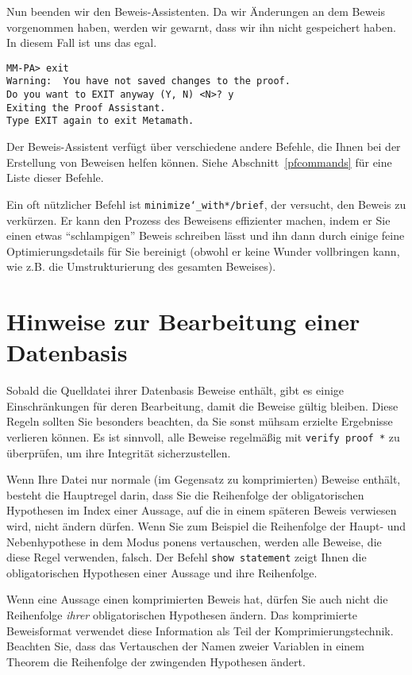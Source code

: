 Nun beenden wir den Beweis-Assistenten.  Da wir Änderungen an dem Beweis vorgenommen haben, werden wir gewarnt, dass wir ihn nicht gespeichert haben.  In diesem Fall ist uns das egal.

\begin{verbatim}
MM-PA> exit
Warning:  You have not saved changes to the proof.
Do you want to EXIT anyway (Y, N) <N>? y
Exiting the Proof Assistant.
Type EXIT again to exit Metamath.
\end{verbatim}

Der Beweis-Assistent verfügt über verschiedene andere Befehle, die Ihnen bei der Erstellung von Beweisen helfen können.  Siehe Abschnitt~\ref{pfcommands} für eine Liste dieser Befehle.

Ein oft nützlicher Befehl ist \texttt{minimize{\char`\_}with*/brief}, der versucht, den Beweis zu verkürzen.  Er kann den Prozess des Beweisens effizienter machen, indem er Sie einen etwas "`schlampigen"' Beweis schreiben lässt und ihn dann durch einige feine Optimierungsdetails für Sie bereinigt (obwohl er keine Wunder vollbringen kann, wie z.B. die Umstrukturierung des gesamten Beweises).

\section{\sloppy Hinweise zur Bearbeitung einer Daten\-basis}

Sobald die Quelldatei ihrer Datenbasis Beweise enthält, gibt es einige Einschränkungen für deren Bearbeitung, damit die Beweise gültig bleiben.
Diese Regeln sollten Sie besonders beachten, da Sie sonst mühsam erzielte Ergebnisse verlieren können. Es ist sinnvoll, alle Beweise regelmäßig mit \texttt{verify proof *} zu überprüfen, um ihre Integrität sicherzustellen.

Wenn Ihre Datei nur normale (im Gegensatz zu komprimierten) Beweise enthält, besteht die Hauptregel darin, dass Sie die Reihenfolge der obligatorischen Hypothesen im Index einer Aussage, auf die in einem späteren Beweis verwiesen wird, nicht ändern dürfen.  Wenn Sie zum Beispiel die Reihenfolge der Haupt- und Nebenhypothese in dem Modus ponens vertauschen, werden alle Beweise, die diese Regel verwenden, falsch.  Der Befehl \texttt{show statement}  zeigt Ihnen die obligatorischen Hypothesen einer Aussage und ihre Reihenfolge.

Wenn eine Aussage einen komprimierten Beweis hat, dürfen Sie auch nicht die Reihenfolge {\em ihrer} obligatorischen Hypothesen ändern.
Das komprimierte Beweisformat verwendet diese Information als Teil der Komprimierungstechnik. Beachten Sie, dass das Vertauschen der Namen zweier Variablen in einem Theorem die Reihenfolge der zwingenden Hypothesen ändert.

